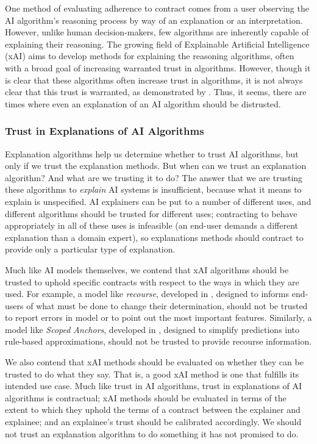 One method of evaluating adherence to contract comes from a user observing the AI algorithm's reasoning process by way of an explanation or an interpretation. However, unlike human decision-makers, few algorithms are inherently capable of explaining their reasoning. The growing field of Explainable Artificial Intelligence (xAI) aims to develop methods for explaining the reasoning algorithms, often with a broad goal of increasing warranted trust in algorithms. However, though it is clear that these algorithms often increase trust in algorithms, it is not always clear that this trust is warranted, as demonstrated by \textcite{jacobs_how_2021}. Thus, it seems, there are times where even an explanation of an AI algorithm should be distrusted.

\subsubsection{Trust in Explanations of AI Algorithms}
Explanation algorithms help us determine whether to trust AI algorithms, but only if we trust the explanation methods. But when can we trust an explanation algorithm? And what are we trusting it to do? The answer that we are trusting these algorithms to \emph{explain} AI systems is insufficient, because what it means to explain is unspecified. AI explainers can be put to a number of different uses, and different algorithms should be trusted for different uses; contracting to behave appropriately in all of these uses is infeasible (an end-user demands a different explanation than a domain expert), so explanations methods should contract to provide only a particular type of explanation.

Much like AI models themselves, we contend that xAI algorithms should be trusted to uphold specific contracts with respect to the ways in which they are used. For example, a model like \textit{recourse}, developed in \textcite{ustun_actionable_2019}, designed to informs end-users of what must be done to change their determination, should not be trusted to report errors in model or to point out the most important features. Similarly, a model like \textit{Scoped Anchors}, developed in \textcite{ribeiro_anchors_2018}, designed to simplify predictions into rule-based approximations, should not be trusted to provide recourse information.

We also contend that xAI methods should be evaluated on whether they can be trusted to do what they say. That is, a good xAI method is one that fulfills its intended use case. Much like trust in AI algorithms, trust in explanations of AI algorithms is contractual; xAI methods should be evaluated in terms of the extent to which they uphold the terms of a contract between the explainer and explainee; and an explainee's trust should be calibrated accordingly. We should not trust an explanation algorithm to do something it has not promised to do. 

